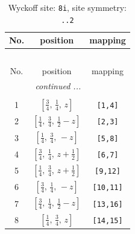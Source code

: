 \documentclass[fleqn,8pt]{jsarticle}
\begin{document}
\begin{longtable}{ccc}
\caption{Wyckoff site: {\tt 8i}, site symmetry: {\tt ..2}}
 \\
 \hline \hline
No. & position & mapping \\ \hline \endfirsthead

\multicolumn{2}{l}{\tablename\ \thetable{}} \\
 \hline \hline
No. & position & mapping \\ \hline \endhead

 \hline \hline
\multicolumn{2}{r}{\footnotesize\it continued ...} \\ \endfoot

 \hline \hline
\multicolumn{2}{r}{} \\ \endlastfoot

1 & $\left[ \frac{3}{4},\, \frac{1}{4},\, z \right]$ & {\tt [1,4]} \\ \hline
2 & $\left[ \frac{1}{4},\, \frac{3}{4},\, \frac{1}{2} - z \right]$ & {\tt [2,3]} \\ \hline
3 & $\left[ \frac{1}{4},\, \frac{3}{4},\, - z \right]$ & {\tt [5,8]} \\ \hline
4 & $\left[ \frac{3}{4},\, \frac{1}{4},\, z + \frac{1}{2} \right]$ & {\tt [6,7]} \\ \hline
5 & $\left[ \frac{1}{4},\, \frac{3}{4},\, z + \frac{1}{2} \right]$ & {\tt [9,12]} \\ \hline
6 & $\left[ \frac{3}{4},\, \frac{1}{4},\, - z \right]$ & {\tt [10,11]} \\ \hline
7 & $\left[ \frac{3}{4},\, \frac{1}{4},\, \frac{1}{2} - z \right]$ & {\tt [13,16]} \\ \hline
8 & $\left[ \frac{1}{4},\, \frac{3}{4},\, z \right]$ & {\tt [14,15]} \\
\end{longtable}
\renewcommand{\arraystretch}{1.2}
\end{document}
